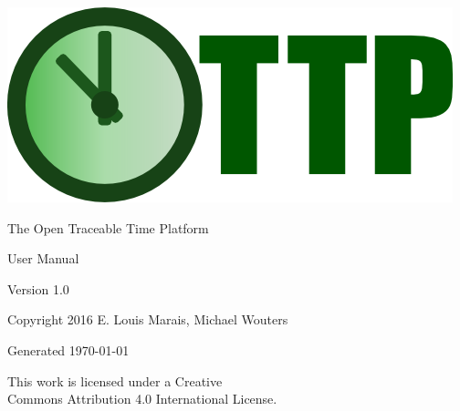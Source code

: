 \documentclass[11pt,a4paper,openany,oneside]{book}
\begin{document}
\begin{titlepage}

\begin{center}
\centerline{\includegraphics{figures/ottplogo.png}}
\end{center}

\vspace*{4cm} 

\begin{center}
{\Huge The Open Traceable Time Platform}
\end{center}

\vspace*{4cm} 

\begin{center}
{\Huge User Manual}
\end{center}

\vspace*{4cm}

\begin{center}
Version 1.0
\end{center}

\begin{center}
Copyright 2016 E. Louis Marais, Michael Wouters
\end{center}

\begin{center}
Generated \today
\end{center}

\end{titlepage}


\begin{titlepage}

\begin{center}
{\Large This work is licensed under a Creative \\
Commons Attribution 4.0 International License.}
\end{center}

\end{titlepage}
\end{document}
